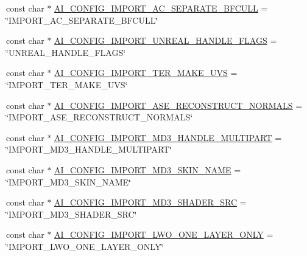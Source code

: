 \begin{DoxyCompactItemize}
\item 
const char $\ast$ \hyperlink{namespaceassimp_1_1config_a2fd65e4aa5a4b3fcf8ebbe5a2cea966f}{A\+I\+\_\+\+C\+O\+N\+F\+I\+G\+\_\+\+I\+M\+P\+O\+R\+T\+\_\+\+A\+C\+\_\+\+S\+E\+P\+A\+R\+A\+T\+E\+\_\+\+B\+F\+C\+U\+L\+L} = \char`\"{}I\+M\+P\+O\+R\+T\+\_\+\+A\+C\+\_\+\+S\+E\+P\+A\+R\+A\+T\+E\+\_\+\+B\+F\+C\+U\+L\+L\char`\"{}
\item 
const char $\ast$ \hyperlink{namespaceassimp_1_1config_ad6777325b39ed97328ccdc4e69d420e8}{A\+I\+\_\+\+C\+O\+N\+F\+I\+G\+\_\+\+I\+M\+P\+O\+R\+T\+\_\+\+U\+N\+R\+E\+A\+L\+\_\+\+H\+A\+N\+D\+L\+E\+\_\+\+F\+L\+A\+G\+S} = \char`\"{}U\+N\+R\+E\+A\+L\+\_\+\+H\+A\+N\+D\+L\+E\+\_\+\+F\+L\+A\+G\+S\char`\"{}
\item 
const char $\ast$ \hyperlink{namespaceassimp_1_1config_abd588cf6059277ffed401109a704f132}{A\+I\+\_\+\+C\+O\+N\+F\+I\+G\+\_\+\+I\+M\+P\+O\+R\+T\+\_\+\+T\+E\+R\+\_\+\+M\+A\+K\+E\+\_\+\+U\+V\+S} = \char`\"{}I\+M\+P\+O\+R\+T\+\_\+\+T\+E\+R\+\_\+\+M\+A\+K\+E\+\_\+\+U\+V\+S\char`\"{}
\item 
const char $\ast$ \hyperlink{namespaceassimp_1_1config_a4bcd2c2fbc96402c40a95ffbf53b1f63}{A\+I\+\_\+\+C\+O\+N\+F\+I\+G\+\_\+\+I\+M\+P\+O\+R\+T\+\_\+\+A\+S\+E\+\_\+\+R\+E\+C\+O\+N\+S\+T\+R\+U\+C\+T\+\_\+\+N\+O\+R\+M\+A\+L\+S} = \char`\"{}I\+M\+P\+O\+R\+T\+\_\+\+A\+S\+E\+\_\+\+R\+E\+C\+O\+N\+S\+T\+R\+U\+C\+T\+\_\+\+N\+O\+R\+M\+A\+L\+S\char`\"{}
\item 
const char $\ast$ \hyperlink{namespaceassimp_1_1config_acc3402a97b8c02e2c656e0a50b2dc997}{A\+I\+\_\+\+C\+O\+N\+F\+I\+G\+\_\+\+I\+M\+P\+O\+R\+T\+\_\+\+M\+D3\+\_\+\+H\+A\+N\+D\+L\+E\+\_\+\+M\+U\+L\+T\+I\+P\+A\+R\+T} = \char`\"{}I\+M\+P\+O\+R\+T\+\_\+\+M\+D3\+\_\+\+H\+A\+N\+D\+L\+E\+\_\+\+M\+U\+L\+T\+I\+P\+A\+R\+T\char`\"{}
\item 
const char $\ast$ \hyperlink{namespaceassimp_1_1config_ae971a2b82c314b6080093510f05127c0}{A\+I\+\_\+\+C\+O\+N\+F\+I\+G\+\_\+\+I\+M\+P\+O\+R\+T\+\_\+\+M\+D3\+\_\+\+S\+K\+I\+N\+\_\+\+N\+A\+M\+E} = \char`\"{}I\+M\+P\+O\+R\+T\+\_\+\+M\+D3\+\_\+\+S\+K\+I\+N\+\_\+\+N\+A\+M\+E\char`\"{}
\item 
const char $\ast$ \hyperlink{namespaceassimp_1_1config_a30c6e61323ae2e07425f9d9f6bc14862}{A\+I\+\_\+\+C\+O\+N\+F\+I\+G\+\_\+\+I\+M\+P\+O\+R\+T\+\_\+\+M\+D3\+\_\+\+S\+H\+A\+D\+E\+R\+\_\+\+S\+R\+C} = \char`\"{}I\+M\+P\+O\+R\+T\+\_\+\+M\+D3\+\_\+\+S\+H\+A\+D\+E\+R\+\_\+\+S\+R\+C\char`\"{}
\item 
const char $\ast$ \hyperlink{namespaceassimp_1_1config_a80bb67e3c04b992ed7679a15825b0df2}{A\+I\+\_\+\+C\+O\+N\+F\+I\+G\+\_\+\+I\+M\+P\+O\+R\+T\+\_\+\+L\+W\+O\+\_\+\+O\+N\+E\+\_\+\+L\+A\+Y\+E\+R\+\_\+\+O\+N\+L\+Y} = \char`\"{}I\+M\+P\+O\+R\+T\+\_\+\+L\+W\+O\+\_\+\+O\+N\+E\+\_\+\+L\+A\+Y\+E\+R\+\_\+\+O\+N\+L\+Y\char`\"{}

\end{DoxyCompactItemize}
